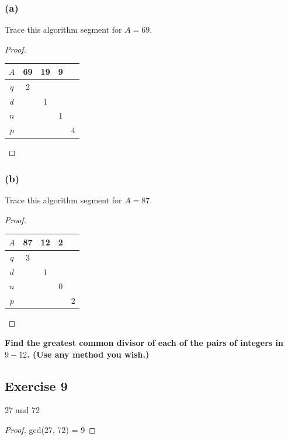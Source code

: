 \documentclass[14pt]{extarticle}
\newcommand{\cy}{\color{cyan}}
\begin{document}
\subsubsection{(a)}
Trace this algorithm segment for $A = 69$.

\begin{proof}
\begin{center}
\begin{tabular}{|c|c|c|c|c|}
\hline
$A$ & 69 & 19 & 9 &  \\
\hline
$q$ & 2 &  &  & \\
\hline
$d$ &  & 1 &  & \\
\hline
$n$ &  &  & 1 &  \\
\hline
$p$ &  &  & & 4 \\
\hline
\end{tabular}
\end{center}
\end{proof}

\subsubsection{(b)}
Trace this algorithm segment for $A = 87$.

\begin{proof}
\begin{center}
\begin{tabular}{|c|c|c|c|c|}
\hline
$A$ & 87 & 12 & 2 &  \\
\hline
$q$ & 3 &  &  & \\
\hline
$d$ &  & 1 &  & \\
\hline
$n$ &  &  & 0 &  \\
\hline
$p$ &  &  & & 2 \\
\hline
\end{tabular}
\end{center}
\end{proof}

{\bf \cy Find the greatest common divisor of each of the pairs of integers in $9-12$. (Use any method you wish.)}

\subsection{Exercise 9}
27 and 72

\begin{proof}
gcd(27, 72) = 9
\end{proof}
\end{document}
